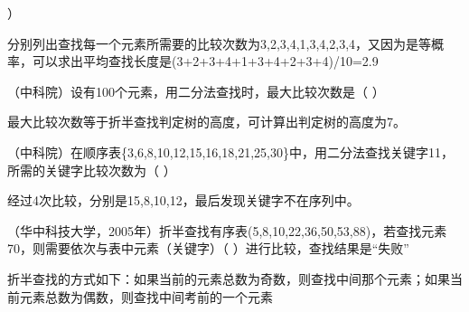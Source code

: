 ）
\par{}
\begin{solution}分别列出查找每一个元素所需要的比较次数为3,2,3,4,1,3,4,2,3,4，又因为是等概率，可以求出平均查找长度是(3+2+3+4+1+3+4+2+3+4)/10=2.9
\end{solution}
\question （中科院）设有100个元素，用二分法查找时，最大比较次数是（ ）
\par{}
\begin{solution}最大比较次数等于折半查找判定树的高度，可计算出判定树的高度为7。
\end{solution}
\question （中科院）在顺序表\{3,6,8,10,12,15,16,18,21,25,30\}中，用二分法查找关键字11，所需的关键字比较次数为（
）
\par{}
\begin{solution}经过4次比较，分别是15,8,10,12，最后发现关键字不在序列中。
\end{solution}
\question （华中科技大学，2005年）折半查找有序表(5,8,10,22,36,50,53,88)，若查找元素70，则需要依次与表中元素（关键字）（
）进行比较，查找结果是``失败''
\par{}
\begin{solution}折半查找的方式如下：如果当前的元素总数为奇数，则查找中间那个元素；如果当前元素总数为偶数，则查找中间考前的一个元素
\end{solution}
